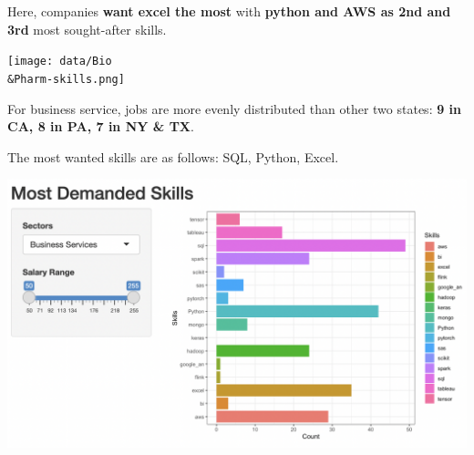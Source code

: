 \documentclass[
]{article}
\begin{document}
Here, companies \textbf{want excel the most} with \textbf{python and AWS
as 2nd and 3rd} most sought-after skills.

\texttt{[image: data/Bio\\\&Pharm-skills.png]}

For business service, jobs are more evenly distributed than other two
states: \textbf{9 in CA, 8 in PA, 7 in NY \& TX}.

The most wanted skills are as follows: SQL, Python, Excel.

\includegraphics{data/Business_Service-skills.png}
\end{document}
